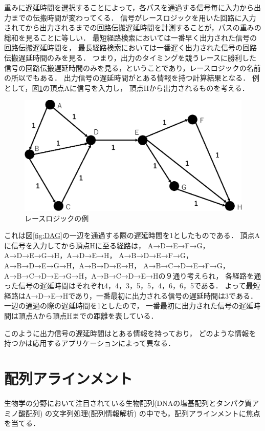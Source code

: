 重みに遅延時間を選択することによって，各パスを通過する信号毎に入力から出力までの伝搬時間が変わってくる．
信号がレースロジックを用いた回路に入力されてから出力されるまでの回路伝搬遅延時間を計測することが，パスの重みの総和を見ることに等しい．
最短経路検索においては一番早く出力された信号の回路伝搬遅延時間を，
最長経路検索においては一番遅く出力された信号の回路伝搬遅延時間のみを見る．
つまり，出力のタイミングを競うレースに勝利した信号の回路伝搬遅延時間のみを見る，ということであり，レースロジックの名前の所以でもある．
出力信号の遅延時間がとある情報を持つ計算結果となる．
例として，図\ref{fig:DAG1}の頂点Aに信号を入力し，
頂点Hから出力されるものを考える．
\begin{figure}[t!]
\begin{center}
\includegraphics[keepaspectratio,scale=0.5]{fig/2/DAG1.eps}
\caption{レースロジックの例}
\label{fig:DAG1}
\end{center}
\end{figure}
これは図\ref{fig:DAG}の一辺を通過する際の遅延時間を1としたものである．
頂点Aに信号を入力してから頂点Hに至る経路は，
A→D→E→F→G，A→D→E→G→H，A→D→E→H，
A→B→D→E→F→G，A→B→D→E→G→H，A→B→D→E→H，
A→B→C→D→E→F→G，A→B→C→D→E→G→H，A→B→C→D→E→Hの９通り考えられ，
各経路を通った信号の遅延時間はそれぞれ4，4，3，5，5，4，6，6，5である．
よって最短経路はA→D→E→Hであり，一番最初に出力される信号の遅延時間は3である．
一辺の通過の際の遅延時間を1としたので，
一番最初に出力された信号の遅延時間は頂点Aから頂点Hまでの距離を表している．

このように出力信号の遅延時間はとある情報を持っており，
どのような情報を持つかは応用するアプリケーションによって異なる．

\section{配列アラインメント}
生物学の分野において注目されている生物配列(DNAの塩基配列とタンパク質アミノ酸配列) の文字列処理(配列情報解析)
\cite{浅井潔2000配列情報と確立モデル,後藤修1998マルチプルアラインメントは生体高分子情報の交差点}
の中でも，配列アラインメントに焦点を当てる．

